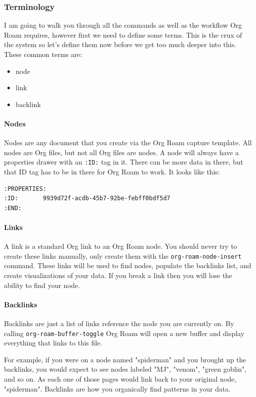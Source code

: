 \documentclass[11pt]{article}
\begin{document}
\subsubsection*{Terminology}
\label{sec:org581c78a}
I am going to walk you through all the commands as well as the workflow Org Roam requires, however first we need to define some terms. This is the crux of the system so let's define them now before we get too much deeper into this. These common terms are:

\begin{itemize}
\item node
\item link
\item backlink
\end{itemize}
\paragraph*{Nodes}
\label{sec:org2a50030}
Nodes are any document that you create via the Org Roam capture template. All nodes are Org files, but not all Org files are nodes. A node will always have a properties drawer with an \texttt{:ID:} tag in it. There can be more data in there, but that ID tag has to be in there for Org Roam to work. It looks like this:

\begin{verbatim}
:PROPERTIES:
:ID:       9939d72f-acdb-45b7-92be-febff0bdf5d7
:END:
\end{verbatim}
\paragraph*{Links}
\label{sec:orgd1e73f9}
A link is a standard Org link to an Org Roam node. You should never try to create these links manually, only create them with the \texttt{org-roam-node-insert} command. These links will be used to find nodes, populate the backlinks list, and create visualizations of your data. If you break a link then you will lose the ability to find your node.
\paragraph*{Backlinks}
\label{sec:org1cbc5bf}
Backlinks are just a list of links reference the node you are currently on. By calling \texttt{org-roam-buffer-toggle} Org Roam will open a new buffer and display everything that links to this file.

For example, if you were on a node named "spiderman" and you brought up the backlinks, you would expect to see nodes labeled "MJ", "venom", "green goblin", and so on. As each one of those pages would link back to your original node, "spiderman". Backlinks are how you organically find patterns in your data.
\end{document}
